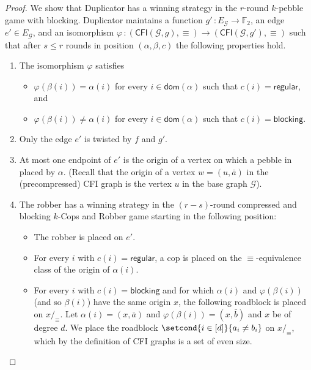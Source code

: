 \documentclass[a4paper,english, thm-restate]{lipics-v2021}
\newcommand{\regular}{\mathsf{regular}}
\newcommand{\blocking}{\mathsf{blocking}}
\renewcommand{\phi}{\varphi}
\newcommand{\comp}{\equiv}
\newcommand{\CFIsym}{\mathsf{CFI}}
\newcommand{\CFI}[1]{\CFIsym(#1)}
\newcommand{\precompCFI}[2]{{(\CFI{#1},#2)}}
\newcommand{\FF}{\mathbb{F}}
\newcommand{\tup}[1]{\bar{#1}}
\newcommand{\graphG}{\mathcal{G}}
\newcommand{\edgeG}{E_{\graphG}}
\newcommand{\dom}{\mathsf{dom}}
\begin{document}
%
\begin{proof}
        We show that Duplicator has a winning strategy in the $r$-round $k$-pebble game with blocking. Duplicator maintains a function $g' \, \colon \edgeG \to \FF_2$, an edge $e' \in \edgeG$,
        and an isomorphism $\phi  \, \colon \precompCFI{\graphG,g}{\comp} \to \precompCFI{\graphG,g'}{\comp}$ 
        such that after $s\leq r$ rounds in position $(\alpha, \beta, c)$ the following properties hold.
        \begin{enumerate}
                \item  \label{cond:iso} The isomorphism $\phi$ satisfies
                \begin{itemize} 
                \item $\phi(\beta(i)) = \alpha(i)$ for every $i\in \dom(\alpha)$ such that $c(i) = \regular$, and
                \item   $\phi(\beta(i)) \neq \alpha(i)$ for every $i\in \dom(\alpha)$ such that $c(i) = \blocking$.
                \end{itemize}
                \item \label{cond:one-twist} Only the edge $e'$ is twisted by $f$ and $g'$.
                \item \label{cond:not-caught} At most one endpoint of $e'$ is the origin of a vertex on which a pebble in placed by $\alpha$. (Recall that the origin of a vertex $w = (u, \tup{a})$ in the (precompressed) CFI graph is the vertex $u$ in the base graph $\graphG$).
                \item \label{cond:not-lose} The robber has a winning strategy in the $(r-s)$-round compressed and blocking $k$-Cops and Robber game
                starting in the following position:
                \begin{itemize}
                        \item The robber is placed on $e'$.
                        \item For every $i$ with $c(i) = \regular$, a cop is placed on
                        the $\comp$-equivalence class of the origin of $\alpha(i)$. 
                        \item For every $i$ with $c(i) = \blocking$
                        and for which $\alpha(i)$ and $\phi(\beta(i))$ (and so $\beta(i)$) have the same origin $x$,
                        the following roadblock is placed on $x/_\comp$. Let $\alpha(i) = (x,\tup{a})$ and $\phi(\beta(i)) = (x, \tup{b})$ and $x$ be of degree $d$. We place the roadblock $\setcond{i \in [d]} { a_i \neq b_i}$
                        on $x/_\comp$,
                        which by the definition of CFI graphs is a set of even size.
                \end{itemize}
        \end{enumerate}
        

\end{proof}
\end{document}
